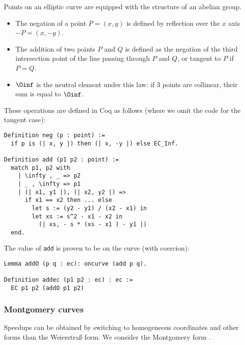 Points on an elliptic curve are equipped with the structure of an abelian group.
\begin{itemize}
  \item The negation of a point $P = (x,y)$ is defined by reflection over the $x$ axis $-P = (x, -y)$.
  \item The addition of two points $P$ and $Q$ is defined as the negation of the third intersection point
  of the line passing through $P$ and $Q$, or tangent to $P$ if $P = Q$.
  \item $\Oinf$ is the neutral element under this law: if 3 points are collinear, their sum is equal to $\Oinf$.
\end{itemize}
These operations are defined in Coq as follows (where we omit the code for the tangent case):
\begin{lstlisting}[language=Coq]
Definition neg (p : point) :=
  if p is (| x, y |) then (| x, -y |) else EC_Inf.

Definition add (p1 p2 : point) :=
  match p1, p2 with
    | \infty , _ => p2
    | _ , \infty => p1
    | (| x1, y1 |), (| x2, y2 |) =>
      if x1 == x2 then ... else
        let s := (y2 - y1) / (x2 - x1) in
        let xs := s^2 - x1 - x2 in
          (| xs, - s * (xs - x1 ) - y1 |)
  end.
\end{lstlisting}
The value of \texttt{add} is proven to be on the curve (with coercion):
\begin{lstlisting}[language=Coq]
Lemma addO (p q : ec): oncurve (add p q).

Definition addec (p1 p2 : ec) : ec :=
  EC p1 p2 (addO p1 p2)
\end{lstlisting}

\subsubsection{Montgomery curves}
\label{subsec:ECC-Montgomery}

Speedups can be obtained by switching to homogeneous coordinates and other forms
than the Weierstra{\ss} form. We consider the Montgomery form \cite{MontgomerySpeeding}.

